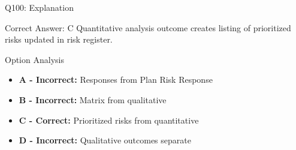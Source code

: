 \documentclass{beamer}
\begin{document}
	\begin{frame}{Q100: Explanation}
		\begin{block}{Correct Answer: C}
			Quantitative analysis outcome creates listing of prioritized risks updated in risk register.
		\end{block}
		\begin{block}{Option Analysis}
			\begin{itemize}
				\item \textbf{A - Incorrect:} Responses from Plan Risk Response
				\item \textbf{B - Incorrect:} Matrix from qualitative
				\item \textbf{C - Correct:} Prioritized risks from quantitative
				\item \textbf{D - Incorrect:} Qualitative outcomes separate
			\end{itemize}
		\end{block}
	\end{frame}
\end{document}
